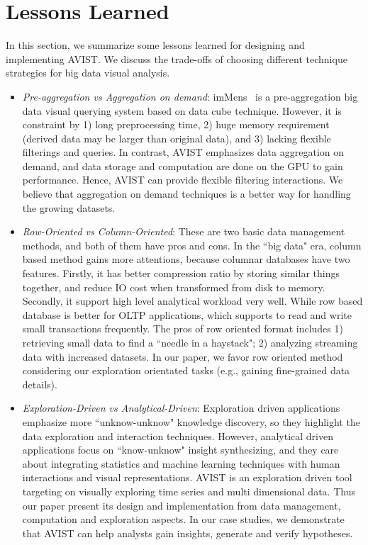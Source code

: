 \section{Lessons Learned}

 In this section, we summarize some lessons learned for designing and implementing AVIST. We discuss the trade-offs of choosing different technique strategies for big data visual analysis.
 

\begin{itemize}
	\item \textit{Pre-aggregation vs Aggregation on demand}: imMens~\cite{2013-immens} is a pre-aggregation big data visual querying system based on data cube technique. However, it is constraint by 1) long preprocessing time, 2) huge memory requirement (derived data may be larger than original data), and 3) lacking flexible filterings and queries. In contrast, AVIST emphasizes data aggregation on demand, and data storage and computation are done on the GPU to gain performance. Hence, AVIST can provide flexible filtering interactions. We believe that aggregation on demand techniques is a better way for handling the growing datasets.
	
	\item \textit{Row-Oriented vs Column-Oriented}:
	These are two basic data management methods, and both of them have pros and cons. In the ``big data" era, column based method gains more attentions, because columnar databases have two features. Firstly, it has better compression ratio by storing similar things together, and reduce IO cost when transformed from disk to memory. Secondly, it support high level analytical workload very well. While row based database is better for OLTP applications, which supports to  read and write small transactions frequently. The pros of row oriented format includes 1) retrieving small data to find a ``needle in a haystack"; 2) analyzing streaming data with increased datasets. In our paper, we favor row oriented method considering our exploration orientated tasks (e.g., gaining fine-grained data details). 
	
	\item \textit{Exploration-Driven vs Analytical-Driven}:
	 Exploration driven applications emphasize more ``unknow-unknow" knowledge discovery, so they highlight  the data exploration and interaction techniques.
	  However, analytical driven applications focus on ``know-unknow" insight synthesizing, and  they care about integrating statistics and machine learning techniques with human interactions and visual representations.
	  AVIST is an exploration driven tool targeting on visually exploring time series and multi dimensional data. Thus our paper present its design and implementation from data management, computation and exploration aspects.
	   In our case studies, we demonstrate that AVIST can help analysts gain insights,  generate and verify hypotheses.  
	

\end{itemize}
